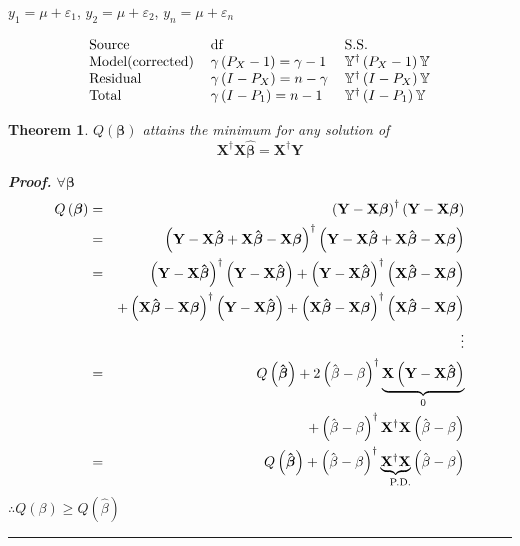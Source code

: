 \documentclass{article}
\newtheorem{theorem}{Theorem}
\newenvironment{proof}[1][Proof]{\noindent\textbf{#1.} }{\ \rule{0.5em}{0.5em}}
\begin{document}
\bigskip

$y_{1}=\mu +\varepsilon _{1}$, $y_{2}=\mu +\varepsilon _{2}$, $y_{n}=\mu
+\varepsilon _{n}$

\begin{equation*}
\begin{tabular}{lll}
Source & df & S.S. \\ 
Model(corrected) & $\gamma \left( P_{X}-1\right) =\gamma -1$ & $\mathbb{Y}%
^{\dagger }\left( P_{X}-1\right) \mathbb{Y}$ \\ 
Residual & $\gamma \left( I-P_{X}\right) =n-\gamma $ & $\mathbb{Y}^{\dagger
}\left( I-P_{X}\right) \mathbb{Y}$ \\ 
Total & $\gamma \left( I-P_{1}\right) =n-1$ & $\mathbb{Y}^{\dagger }\left(
I-P_{1}\right) \mathbb{Y}$%
\end{tabular}%
\end{equation*}

\begin{theorem}
$Q\left( \mathbf{\beta }\right) $ attains the minimum for any solution of%
\begin{equation*}
\mathbf{X}^{\dagger }\mathbf{X\hat{\beta}}=\mathbf{X}^{\mathbb{\dagger }}%
\mathbf{Y}
\end{equation*}

\begin{proof}
$\forall \mathbf{\beta }$%
\begin{eqnarray*}
Q\left( \mathbf{\beta }\right) &=&\left( \mathbf{Y-X\beta }\right) ^{\dagger
}\left( \mathbf{Y-X\beta }\right) \\
&=&\left( \mathbf{Y-X\hat{\beta}+X\hat{\beta}-X\beta }\right) ^{\dagger
}\left( \mathbf{Y-X\hat{\beta}+X\hat{\beta}-X\beta }\right) \\
&=&\left( \mathbf{Y-X\hat{\beta}}\right) ^{\dagger }\left( \mathbf{Y-X\hat{%
\beta}}\right) +\left( \mathbf{Y-X\hat{\beta}}\right) ^{\dagger }\left( 
\mathbf{X\hat{\beta}-X\beta }\right) \\
&&+\left( \mathbf{X\hat{\beta}-X\beta }\right) ^{\dagger }\left( \mathbf{Y-X%
\hat{\beta}}\right) +\left( \mathbf{X\hat{\beta}-X\beta }\right) ^{\dagger
}\left( \mathbf{X\hat{\beta}-X\beta }\right) \\
&&\vdots \\
&=&Q\left( \mathbf{\hat{\beta}}\right) +2\left( \hat{\beta}-\beta \right)
^{\dagger }\underset{0}{\underbrace{\mathbf{X}\left( \mathbf{Y-X\hat{\beta}}%
\right) }} \\
&&+\left( \hat{\beta}-\beta \right) ^{\dagger }\mathbf{X}^{\dagger }\mathbf{X%
}\left( \hat{\beta}-\beta \right) \\
&=&Q\left( \mathbf{\hat{\beta}}\right) +\left( \hat{\beta}-\beta \right)
^{\dagger }\underset{\text{P.D.}}{\underbrace{\mathbf{X}^{\dagger }\mathbf{X}%
}}\left( \hat{\beta}-\beta \right)
\end{eqnarray*}%
$\therefore Q\left( \beta \right) \geq Q\left( \hat{\beta}\right) $
\end{proof}
\end{theorem}
\end{document}
